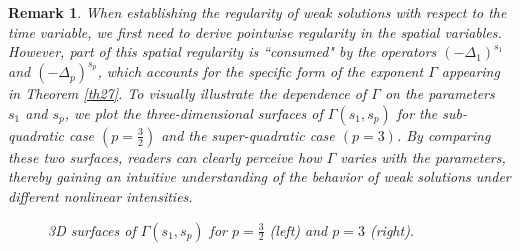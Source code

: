\documentclass[reqno,10pt]{amsart}
\numberwithin{equation}{section}
\newtheorem{remark}[theorem]{Remark}
\begin{document}
\begin{remark}
	\label{rem29}
	When establishing the regularity of weak solutions with respect to the time variable, we first need to derive pointwise regularity in the spatial variables. However, part of this spatial regularity is ``consumed" by the operators $(-\Delta_1)^{s_1}$ and $(-\Delta_p)^{s_p}$, which accounts for the specific form of the exponent $\Gamma$ appearing in Theorem \ref{th27}. To visually illustrate the dependence of $\Gamma$ on the parameters $s_1$ and $s_p$, we plot the three-dimensional surfaces of $\Gamma(s_1,s_p)$ for the sub-quadratic case $\left( p=\frac{3}{2}\right) $ and the super-quadratic case $(p=3)$. By comparing these two surfaces, readers can clearly perceive how $\Gamma$ varies with the parameters, thereby gaining an intuitive understanding of the behavior of weak solutions under different nonlinear intensities.
	\begin{figure}[htbp]
		\centering
		\caption{3D surfaces of $\Gamma(s_1, s_p)$ for $p=\frac{3}{2}$ (left) and $p=3$ (right).}
	\end{figure}
	

\end{remark}
\end{document}
